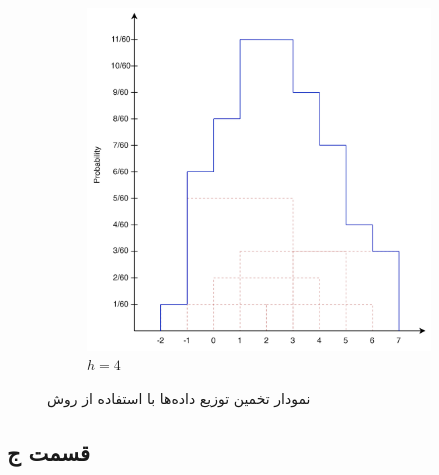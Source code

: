 \documentclass{article}
\begin{document}
\begin{figure}[h]
\begin{subfigure}{0.3\linewidth}
        \includegraphics[width=\linewidth]{images/q1/parzen_h4.png}
        \caption{$h=4$}
    \end{subfigure}
    \caption{نمودار تخمین توزیع داده‌ها با استفاده از روش }
    \label{parzen}
\end{figure}

\newpage

\subsection*{قسمت ج}
\end{document}
